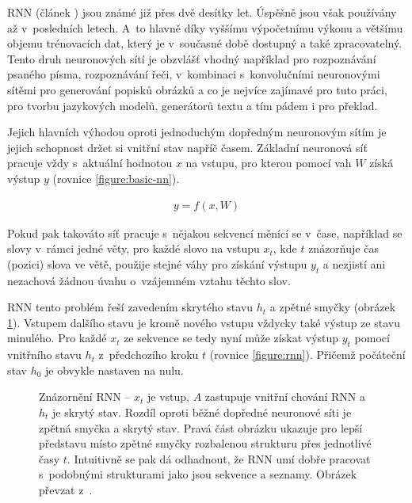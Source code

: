RNN (článek \cite{rnn}) jsou známé již přes dvě desítky let. Úspěšně jsou však používány až v~posledních letech. A~to hlavně díky vyššímu výpočetnímu výkonu a většímu objemu trénovacích dat, který je v~současné době dostupný a také zpracovatelný. Tento druh neuronových sítí je obzvlášť vhodný například pro rozpoznávání psaného písma, rozpoznávání řeči, v~kombinaci s~konvolučními neuronovými sítěmi pro generování popisků obrázků a co je nejvíce zajímavé pro tuto práci, pro tvorbu jazykových modelů, generátorů textu a tím pádem i pro překlad.

Jejich hlavních výhodou oproti jednoduchým dopředným neuronovým sítím je jejich schopnost držet si vnitřní stav napříč časem. Základní neuronová síť pracuje vždy s~aktuální hodnotou $x$ na vstupu, pro kterou pomocí vah $W$ získá výstup $y$ (rovnice \ref{figure:basic-nn}).

\begin{align}\label{figure:basic-nn}
  y = f (x, W)
\end{align}

Pokud pak takováto síť pracuje s~nějakou sekvencí měnící se v~čase, například se slovy v~rámci jedné věty, pro každé slovo na vstupu $x_t$, kde $t$ znázorňuje čas (pozici) slova ve větě, použije stejné váhy pro získání výstupu $y_t$ a nezjistí ani nezachová žádnou úvahu o~vzájemném vztahu těchto slov.

RNN tento problém řeší zavedením skrytého stavu $h_t$ a zpětné smyčky (obrázek \ref{img:rnn}). Vstupem dalšího stavu je kromě nového vstupu vždycky také výstup ze stavu minulého. Pro každé $x_t$ ze sekvence se tedy nyní může získat výstup $y_t$ pomocí vnitřního stavu $h_t$ z~předchozího kroku $t$ (rovnice \ref{figure:rnn}). Přičemž počáteční stav  $h_0$ je obvykle nastaven na nulu.


\begin{figure}[H]
    \begin{center}
    \end{center}
	\caption{Znázornění RNN -- $x_t$ je vstup, $A$ zastupuje vnitřní chování RNN a $h_t$ je skrytý stav. Rozdíl oproti běžné dopředné neuronové síti je zpětná smyčka a skrytý stav. Pravá část obrázku ukazuje pro lepší představu místo zpětné smyčky rozbalenou strukturu přes jednotlivé časy $t$. Intuitivně se pak dá odhadnout, že RNN umí dobře pracovat s~podobnými strukturami jako jsou sekvence a seznamy. Obrázek převzat z~\cite{understandingLSTM}.}	
	\label{img:rnn}
\end{figure}

